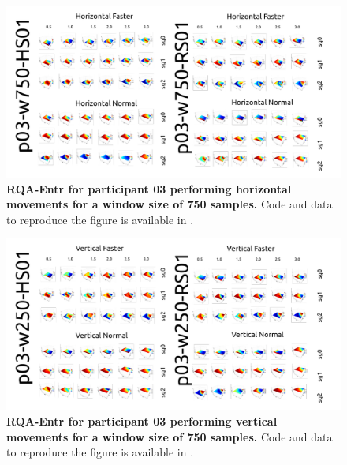 \documentclass[12pt]{article}
\begin{document}


\newpage
\begin{figure}[ht!]
\centering
\includegraphics{sm-fig23}
    	\caption{
	{\bf RQA-Entr for participant 03 performing horizontal movements for a window size of 750 samples.}
	Code and data to reproduce the figure is available in \cite{srep2021}.
        }
    \label{fig-p03-H-w750}
\end{figure}
\begin{figure}[hb!]
\centering
\includegraphics{sm-fig24}
    	\caption{
	{\bf RQA-Entr for participant 03 performing vertical movements for a window size of 750 samples.}
	Code and data to reproduce the figure is available in \cite{srep2021}.
        }
    \label{fig-p03-V-w750}
\end{figure}
\end{document}
